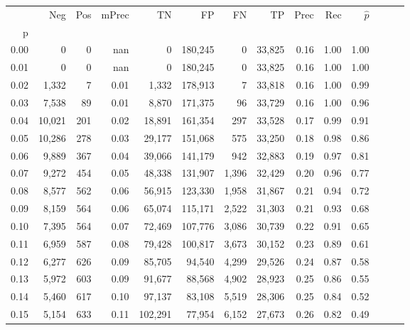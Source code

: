 \begin{tabular}{rrrrrrrrrrrrrr}
\toprule
{} &     Neg &  Pos & mPrec &       TN &       FP &      FN &      TP &  Prec &   Rec & $\hat{p}$ \\
p    &         &      &       &          &          &         &         &       &       &           \\
\midrule
0.00 &       0 &    0 &   nan &        0 &  180,245 &       0 &  33,825 &  0.16 &  1.00 &      1.00 \\
0.01 &       0 &    0 &   nan &        0 &  180,245 &       0 &  33,825 &  0.16 &  1.00 &      1.00 \\
0.02 &   1,332 &    7 &  0.01 &    1,332 &  178,913 &       7 &  33,818 &  0.16 &  1.00 &      0.99 \\
0.03 &   7,538 &   89 &  0.01 &    8,870 &  171,375 &      96 &  33,729 &  0.16 &  1.00 &      0.96 \\
0.04 &  10,021 &  201 &  0.02 &   18,891 &  161,354 &     297 &  33,528 &  0.17 &  0.99 &      0.91 \\
0.05 &  10,286 &  278 &  0.03 &   29,177 &  151,068 &     575 &  33,250 &  0.18 &  0.98 &      0.86 \\
0.06 &   9,889 &  367 &  0.04 &   39,066 &  141,179 &     942 &  32,883 &  0.19 &  0.97 &      0.81 \\
0.07 &   9,272 &  454 &  0.05 &   48,338 &  131,907 &   1,396 &  32,429 &  0.20 &  0.96 &      0.77 \\
0.08 &   8,577 &  562 &  0.06 &   56,915 &  123,330 &   1,958 &  31,867 &  0.21 &  0.94 &      0.72 \\
0.09 &   8,159 &  564 &  0.06 &   65,074 &  115,171 &   2,522 &  31,303 &  0.21 &  0.93 &      0.68 \\
0.10 &   7,395 &  564 &  0.07 &   72,469 &  107,776 &   3,086 &  30,739 &  0.22 &  0.91 &      0.65 \\
0.11 &   6,959 &  587 &  0.08 &   79,428 &  100,817 &   3,673 &  30,152 &  0.23 &  0.89 &      0.61 \\
0.12 &   6,277 &  626 &  0.09 &   85,705 &   94,540 &   4,299 &  29,526 &  0.24 &  0.87 &      0.58 \\
0.13 &   5,972 &  603 &  0.09 &   91,677 &   88,568 &   4,902 &  28,923 &  0.25 &  0.86 &      0.55 \\
0.14 &   5,460 &  617 &  0.10 &   97,137 &   83,108 &   5,519 &  28,306 &  0.25 &  0.84 &      0.52 \\
0.15 &   5,154 &  633 &  0.11 &  102,291 &   77,954 &   6,152 &  27,673 &  0.26 &  0.82 &      0.49 \\

\end{tabular}
